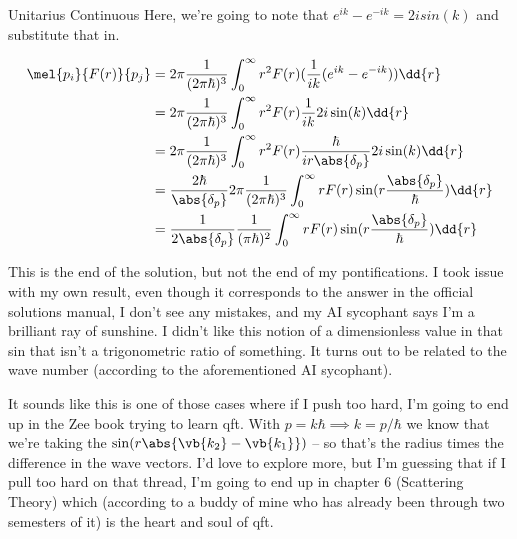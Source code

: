 \begin{answer}
\begin{answerpart}{Unitarius Continuous}
    Here, we're going to note that $e^{ik} - e^{-ik} = 2isin(k)$ and
    substitute that in.

    \begin{equation}
      \begin{alignedat}{2}
        &&\mel{p_i}{F(r)}{p_j}
        &= 2\pi \frac{1}{(2\pi\hbar)^3}
        \int_{0}^{\infty}
        r^2 F(r)
        (\frac{1}{ik}(e^{ik} - e^{-ik}))
        \dd{r}
        \\
        &&&= 2\pi \frac{1}{(2\pi\hbar)^3}
        \int_{0}^{\infty}
        r^2 F(r)
        \frac{1}{ik}
        2i\sin(k)
        \dd{r}
        \\
        &&&= 2\pi \frac{1}{(2\pi\hbar)^3}
        \int_{0}^{\infty}
        r^2 F(r)
        \frac{\hbar}{ir\abs{\delta_p}}
        2i\sin(k)
        \dd{r}
        \\
        &&&=
        \frac{2\hbar}{\abs{\delta_p}}
        2\pi \frac{1}{(2\pi\hbar)^3}
        \int_{0}^{\infty}
        r F(r)
        \sin(r\frac{\abs{\delta_p}}{\hbar})
        \dd{r}
        \\
        &&&=
        \frac{1}{2\abs{\delta_p}}
        \frac{1}{(\pi\hbar)^2}
        \int_{0}^{\infty}
        r F(r)
        \sin(r\frac{\abs{\delta_p}}{\hbar})
        \dd{r}
        \\
      \end{alignedat}
    \end{equation}

    This is the end of the solution, but not the end of my
    pontifications.  I took issue with my own result, even though it
    corresponds to the answer in the official solutions manual, I
    don't see any mistakes, and my AI sycophant says I'm a brilliant
    ray of sunshine.  I didn't like this notion of a dimensionless
    value in that sin that isn't a trigonometric ratio of something.
    It turns out to be related to the wave number (according to the
    aforementioned AI sycophant).

    It sounds like this is one of those cases where if I push too
    hard, I'm going to end up in the Zee book trying to learn
    \ac{qft}.  With $p = k\hbar \implies k = p/\hbar$ we know that
    we're taking the $\sin(r\abs{\vb{k_2} - \vb{k_1}})$ -- so that's the
    radius times the difference in the wave vectors.  I'd love to
    explore more, but I'm guessing that if I pull too hard on that
    thread, I'm going to end up in chapter 6 (Scattering Theory) which
    (according to a buddy of mine who has already been through two
    semesters of it) is the heart and soul of \ac{qft}.

  \end{answerpart}
\end{answer}
